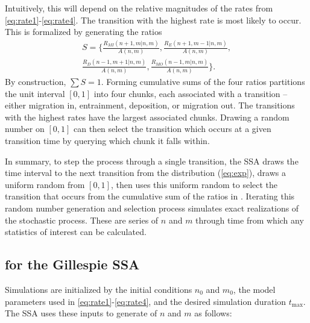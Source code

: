 Intuitively, this will depend on the relative magnitudes of the rates from \DIFdelbegin {}\DIFdelend \DIFaddbegin {}\DIFaddend \ref{eq:rate1}-\ref{eq:rate4}\DIFdelbegin \DIFdel{)}\DIFdelend .
The transition with the highest rate is most likely to occur.
This is formalized by generating the ratios
\begin{multline} S = \Bigg\{\frac{R_{MI}(n+1,m|n,m)}{ A(n,m)},
	\frac{R_E(n+1,m-1|n,m)}{ A(n,m)},\\
	\frac{R_D(n-1,m+1|n,m)}{ A(n,m)},
	\frac{R_{MO}(n-1,m|n,m)}{ A(n,m)}\Bigg\}. \label{eq:rel} \end{multline}
By construction, $\sum S=1$.
Forming cumulative sums of the four ratios partitions the unit interval $[0,1]$ into four chunks, each associated with a transition -- either migration in, entrainment, deposition, or migration out. The transitions with the highest rates have the largest associated chunks. Drawing a random number on $[0,1]$ can then select the transition which occurs at a given transition time by querying which chunk it falls within.

In summary, to step the process through a single transition, the SSA draws the time interval to the next transition from the distribution (\DIFaddbegin {}\DIFaddend \ref{eq:exp}), draws a uniform random \DIFaddbegin {}\DIFaddend from $[0,1]$, then uses this uniform random to select the transition that occurs from the cumulative sum of the ratios in \DIFdelbegin \DIFdel{(\ref{eq:rel})}\DIFdelend \DIFaddbegin {}\DIFaddend . Iterating this random number generation and selection process simulates exact realizations of the stochastic process. These are series of $n$ and $m$ through time from which any statistics of interest can be calculated.

\subsection{\DIFdelbegin {}\DIFdelend \DIFaddbegin {}\DIFaddend for the Gillespie SSA}
\DIFdelbegin %

\DIFdelend \DIFaddbegin \label{sec:crr}
\DIFaddend Simulations are initialized by the initial conditions $n_0$ and $m_0$, the model parameters used in \DIFdelbegin {}\DIFdelend \DIFaddbegin {}\DIFaddend \ref{eq:rate1}-\ref{eq:rate4}, and the desired simulation duration $t_\text{max}$. The SSA uses these inputs to generate \DIFdelbegin {}\DIFdelend \DIFaddbegin {}\DIFaddend of $n$ and $m$ as follows:

